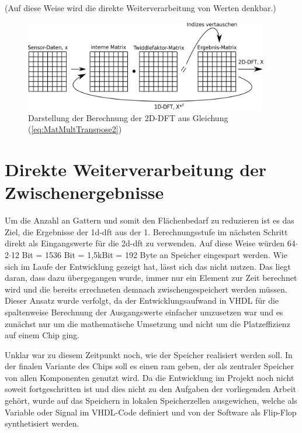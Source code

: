 (Auf diese Weise wird die direkte Weiterverarbeitung von Werten denkbar.)
 
\begin{figure}[htbp]
 \centering
 \includegraphics[width=0.95\textwidth]{img/MatMultTranspose2.png}
 \caption{Darstellung der Berechnung der 2D-DFT aus Gleichung (\ref{eq:MatMultTranspose2})}
 \label{pic:MatMultTranspose}
\end{figure}
 

\section{Direkte Weiterverarbeitung der Zwischenergebnisse}
Um die Anzahl an Gattern und somit den Flächenbedarf zu reduzieren ist es das Ziel, die Ergebnisse der \gls{1d-dft} aus der 1. Berechnungsstufe im nächsten Schritt direkt als 
Eingangswerte für die \gls{2d-dft} zu verwenden. Auf diese Weise würden 64$\cdot$2$\cdot$12 Bit = 1536 Bit = 1,5kBit = 192 Byte an Speicher eingespart werden.
Wie sich im Laufe der Entwicklung gezeigt hat, lässt sich das nicht nutzen. Das liegt daran, dass dazu übergegangen wurde, immer nur ein Element zur Zeit berechnet wird und die 
bereits errechneten demnach zwischengespeichert werden müssen. Dieser Ansatz wurde verfolgt, da der Entwicklungsaufwand in VHDL für die spaltenweise Berechnung der Ausgangswerte 
einfacher umzusetzen war und es zunächst nur um die mathematische Umsetzung und nicht um die Platzeffizienz auf einem Chip ging.

Unklar war zu diesem Zeitpunkt noch, wie der Speicher realisiert werden soll. In der finalen Variante des Chips soll es einen \gls{ram} geben, der als zentraler
Speicher von allen Komponenten genutzt wird. Da die Entwicklung im Projekt noch nicht soweit fortgeschritten ist und dies nicht zu den Aufgaben der vorliegenden Arbeit gehört,
wurde auf das Speichern in lokalen Speicherzellen ausgewichen, welche als Variable oder Signal im VHDL-Code definiert und von der Software als Flip-Flop synthetisiert werden.



